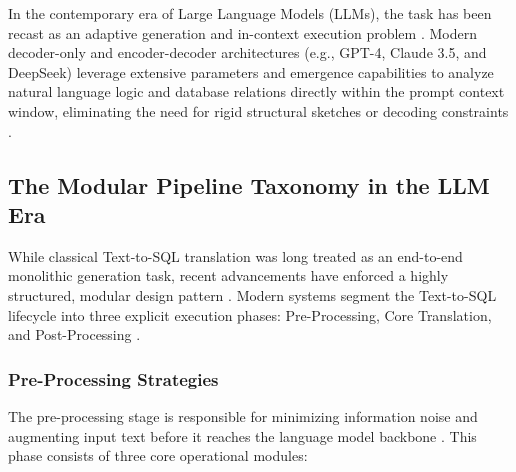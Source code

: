 In the contemporary era of Large Language Models (LLMs), the task has been recast as an adaptive generation and
in-context execution problem \cite{Multi_Agent_Collaborative_Framework_for_Text_to_SQL,
Text_to_SQL_in_the_Era_of_LLMs}. Modern decoder-only and encoder-decoder architectures (e.g., GPT-4, Claude
3.5, and DeepSeek) leverage extensive parameters and emergence capabilities to analyze natural language logic and
database relations directly within the prompt context window, eliminating the need for rigid structural sketches or
decoding constraints \cite{Multi_Agent_Collaborative_Framework_for_Text_to_SQL, Text_to_SQL_in_the_Era_of_LLMs}.

\subsection{The Modular Pipeline Taxonomy in the LLM Era}
While classical Text-to-SQL translation was long treated as an end-to-end monolithic generation task, recent
advancements have enforced a highly structured, modular design pattern \cite{Text_to_SQL_in_the_Era_of_LLMs}. Modern systems
segment the Text-to-SQL lifecycle into three explicit execution phases: Pre-Processing, Core Translation, and
Post-Processing \cite{Text_to_SQL_in_the_Era_of_LLMs}.

\subsubsection{Pre-Processing Strategies}
The pre-processing stage is responsible for minimizing information noise and augmenting input text before it reaches the
language model backbone \cite{Text_to_SQL_in_the_Era_of_LLMs}. This phase consists of three core operational modules:

